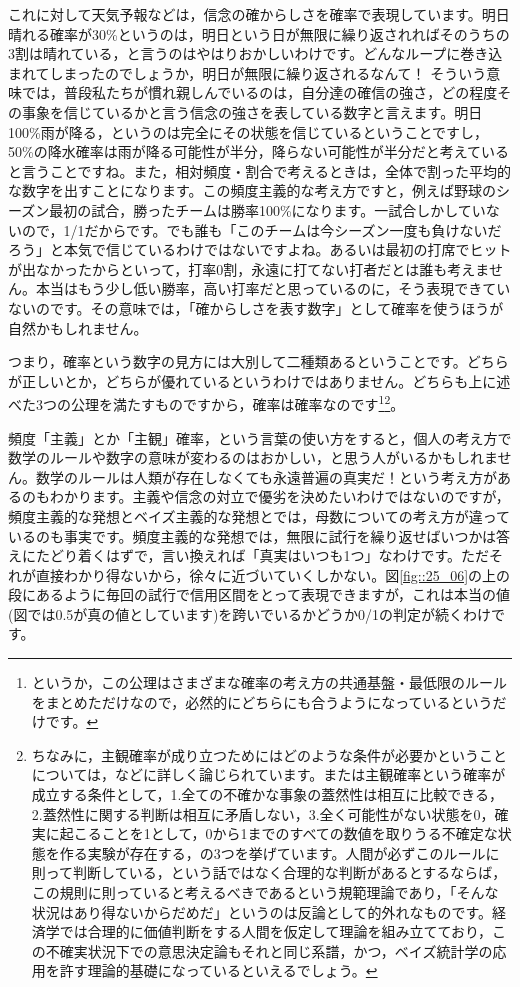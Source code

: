 \documentclass{ltjbook}
\begin{document}
これに対して天気予報などは，信念の確からしさを確率で表現しています。明日晴れる確率が30\%というのは，明日という日が無限に繰り返されればそのうちの3割は晴れている，と言うのはやはりおかしいわけです。どんなループに巻き込まれてしまったのでしょうか，明日が無限に繰り返されるなんて！
そういう意味では，普段私たちが慣れ親しんでいるのは，自分達の確信の強さ，どの程度その事象を信じているかと言う信念の強さを表している数字と言えます。明日100\%雨が降る，というのは完全にその状態を信じているということですし，50\%の降水確率は雨が降る可能性が半分，降らない可能性が半分だと考えていると言うことですね。また，相対頻度・割合で考えるときは，全体で割った平均的な数字を出すことになります。この頻度主義的な考え方ですと，例えば野球のシーズン最初の試合，勝ったチームは勝率100\%になります。一試合しかしていないので，1/1だからです。でも誰も「このチームは今シーズン一度も負けないだろう」と本気で信じているわけではないですよね。あるいは最初の打席でヒットが出なかったからといって，打率0割，永遠に打てない打者だとは誰も考えません。本当はもう少し低い勝率，高い打率だと思っているのに，そう表現できていないのです。その意味では，「確からしさを表す数字」として確率を使うほうが自然かもしれません。

つまり，確率という数字の見方には大別して二種類あるということです。どちらが正しいとか，どちらが優れているというわけではありません。どちらも上に述べた3つの公理を満たすものですから，確率は確率なのです\footnote{というか，この公理はさまざまな確率の考え方の共通基盤・最低限のルールをまとめただけなので，必然的にどちらにも合うようになっているというだけです。}\footnote{ちなみに，主観確率が成り立つためにはどのような条件が必要かということについては，\citet{Gilboa2014}などに詳しく論じられています。また\citet{shigemasu2019}は主観確率という確率が成立する条件として，1.全ての不確かな事象の蓋然性は相互に比較できる，2.蓋然性に関する判断は相互に矛盾しない，3.全く可能性がない状態を0，確実に起こることを1として，0から1までのすべての数値を取りうる不確定な状態を作る実験が存在する，の3つを挙げています。人間が必ずこのルールに則って判断している，という話ではなく合理的な判断があるとするならば，この規則に則っていると考えるべきであるという規範理論であり，「そんな状況はあり得ないからだめだ」というのは反論として的外れなものです。経済学では合理的に価値判断をする人間を仮定して理論を組み立てており，この不確実状況下での意思決定論もそれと同じ系譜，かつ，ベイズ統計学の応用を許す理論的基礎になっているといえるでしょう。}。

頻度「主義」とか「主観」確率，という言葉の使い方をすると，個人の考え方で数学のルールや数字の意味が変わるのはおかしい，と思う人がいるかもしれません。数学のルールは人類が存在しなくても永遠普遍の真実だ！という考え方があるのもわかります。主義や信念の対立で優劣を決めたいわけではないのですが，頻度主義的な発想とベイズ主義的な発想とでは，母数についての考え方が違っているのも事実です。頻度主義的な発想では，無限に試行を繰り返せばいつかは答えにたどり着くはずで，言い換えれば「真実はいつも1つ」なわけです。ただそれが直接わかり得ないから，徐々に近づいていくしかない。図\ref{fig::25_06}の上の段にあるように毎回の試行で信用区間をとって表現できますが，これは本当の値(図では0.5が真の値としています)を跨いでいるかどうか0/1の判定が続くわけです。
\end{document}
